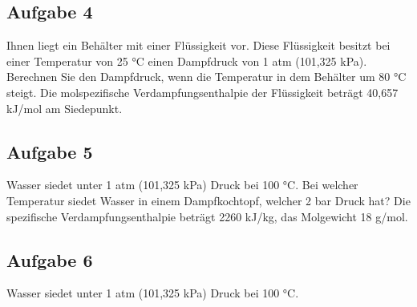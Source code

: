 \documentclass[a4paper,11pt]{article}
\newif\ifshowme
\begin{document}
\subsection*{Aufgabe 4}
Ihnen liegt ein Behälter mit einer Flüssigkeit vor. Diese Flüssigkeit besitzt bei einer
Temperatur von 25 °C einen Dampfdruck von 1 atm (101,325 kPa). Berechnen Sie den
Dampfdruck, wenn die Temperatur in dem Behälter um 80 °C steigt. Die molspezifische
Verdampfungsenthalpie der Flüssigkeit beträgt 40,657 kJ/mol am Siedepunkt. 
\ifshowme
\antwort{
\begin{align*}
\ln(p_3) &= \frac{40.657 ~\text{J/mol}}{8,314 ~\text{J / (mol K)}} \cdot \left( \frac{1}{298,15~\text{K}} - \frac{1}{378,15~\text{K}} \right) + \ln(101,325 \cdot 10^3 ~\text{Pa}) \\
&= 14,99~\text{Pa} \qquad \qquad| e^x \\ \\
p_3 &= 3.255.914,7 ~\text{Pa} \\
&= 32,5 ~\text{bar}
\end{align*}

}
\else
\fi


\subsection*{Aufgabe 5}
Wasser siedet unter 1 atm (101,325 kPa) Druck bei 100 °C. Bei welcher Temperatur siedet
Wasser in einem Dampfkochtopf, welcher 2 bar Druck hat? Die spezifische
Verdampfungsenthalpie beträgt 2260 kJ/kg, das Molgewicht 18 g/mol.
\ifshowme
\antwort{

\begin{align*}
\ln(\frac{p_2}{p_1}) \cdot \frac{R}{\Delta h_{vM}}+\frac{1}{T_2}&=\frac{1}{T_1} \\
\ln(\frac{101.325~\text{Pa}}{200.000~\text{Pa}}) \cdot \frac{8,314 ~\text{J/(mol K)}}{2,26 \cdot 10^6 ~\text{J/kg} \cdot 0,018 ~\text{kg/mol}}+\frac{1}{373,15 ~\text{K}}&=2,541 \cdot 10^{-3} \cdot ~\text{K}^{-1} \qquad | :\frac{1}{x} \\ 
&=393,55 ~\text{K}
\end{align*} 

}
\else
\fi


\subsection*{Aufgabe 6}
Wasser siedet unter 1 atm (101,325 kPa) Druck bei 100 °C.
\end{document}
